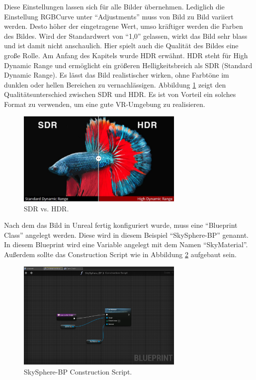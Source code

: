 Diese Einstellungen lassen sich für alle Bilder übernehmen. 
Lediglich die Einstellung RGBCurve unter ``Adjustments'' muss von Bild zu Bild variiert werden. 
Desto höher der eingetragene Wert, umso kräftiger werden die Farben des Bildes. 
Wird der Standardwert von ``1,0'' gelassen, wirkt das Bild sehr blass und ist damit nicht anschaulich. 
Hier spielt auch die Qualität des Bildes eine große Rolle. 
Am Anfang des Kapitels wurde HDR erwähnt. 
HDR steht für High Dynamic Range und ermöglicht ein größeren Helligkeitsbreich als SDR (Standard Dynamic Range). 
Es lässt das Bild realistischer wirken, ohne Farbtöne im dunklen oder hellen Bereichen zu vernachlässigen\cite{eizo19}.
Abbildung \ref{fig-sdr-hdr} zeigt den Qualitätsunterschied zwischen SDR und HDR.
Es ist von Vorteil ein solches Format zu verwenden, um eine gute VR-Umgebung zu realisieren. \\

\begin{figure}[H] \centering
\includegraphics[width=8cm]{Images/sdr.png} 
\caption[SDR vs. HDR]{SDR vs. HDR\cite{finch19}.}
\label{fig-sdr-hdr} 
\end{figure}


Nach dem das Bild in Unreal fertig konfiguriert wurde, muss eine ``Blueprint Class'' angelegt werden. 
Diese wird in diesem Beispiel ``SkySphere-BP'' genannt. 
In diesem Blueprint wird eine Variable angelegt mit dem Namen ``SkyMaterial''. Außerdem sollte das Construction Script wie in Abbildung \ref{fig-skysphere} aufgebaut sein. \\

\begin{figure}[H] \centering
\includegraphics[width=8cm]{Images/skysphere.png} 
\caption{SkySphere-BP Construction Script.}
\label{fig-skysphere} 
\end{figure}



